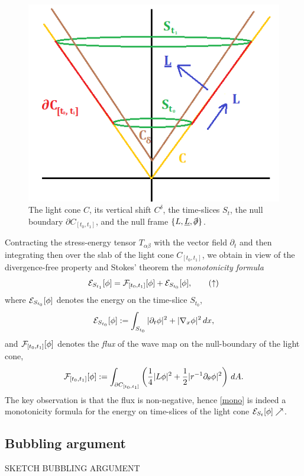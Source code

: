 	
	\begin{figure}[h]
		\begin{center}
			\includegraphics{graphics/cone}
			\caption{The light cone $C$, its vertical shift $C^\delta$, the time-slices $S_{t}$, the null boundary $\partial C_{[t_0, t_1]}$, and the null frame $\{L, \underline L, \slashed\partial\}$. }
		\end{center}	
	\end{figure}	
Contracting the stress-energy tensor $T_{\alpha \beta}$ with the vector field $\partial_t$ and then integrating then over the slab of the light cone $C_{[t_0, t_1]}$, we obtain in view of the divergence-free property and Stokes' theorem the  \emph{monotonicity formula}
	\begin{equation}
		\mathcal E_{S_{t_1}} [\phi] = \mathcal F_{[t_0, t_1]} [\phi] + \mathcal E_{S_{t_0}} [\phi],
		\label{eq:mono}
		\tag{$\uparrow$}
	\end{equation}	
where $\mathcal E_{S_{t_0}} [\phi]$ denotes the energy on the time-slice $S_{t_0}$, 
	\[ \mathcal E_{S_{t_0}} [\phi] := \int_{S_{t_0}} |\partial_t \phi|^2 + |\nabla_x \phi|^2 \, dx ,\]
and $\mathcal F_{[t_0, t_1]} [\phi]$ denotes the \emph{flux} of the wave map on the null-boundary of the light cone,
	\[
		\mathcal F_{[t_0, t_1]} [\phi] := \int_{\partial C_{[t_0, t_1]}} \left( \frac14 |L \phi|^2 + \frac12 |r^{-1} \partial_\theta \phi|^2 \right) \, dA.
	\]
The key observation is that the flux is non-negative, hence \eqref{mono} is indeed a monotonicity formula for the energy on time-slices of the light cone $\mathcal E_{S_t} [\phi] \nearrow$. 

\subsection{Bubbling argument}

	{\color{red} SKETCH BUBBLING ARGUMENT}	